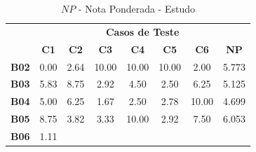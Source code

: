 \begin{table}[htbp]
	\centering
	\caption{$NP$ - Nota Ponderada - Estudo}
	\begin{tabular}{|c|ccccccc|}
		\hline
		\rowcolor[HTML]{D0CECE} 
		\cellcolor[HTML]{D0CECE} &
		\multicolumn{7}{c|}{\cellcolor[HTML]{D0CECE}\textbf{Casos   de Teste}} \\ \cline{2-8} 
		\rowcolor[HTML]{D9D9D9} 
		\multirow{-2}{*}{\cellcolor[HTML]{D0CECE}\textbf{Participante}} &
		\multicolumn{1}{c|}{\cellcolor[HTML]{D9D9D9}\textbf{C1}} &
		\multicolumn{1}{c|}{\cellcolor[HTML]{D9D9D9}\textbf{C2}} &
		\multicolumn{1}{c|}{\cellcolor[HTML]{D9D9D9}\textbf{C3}} &
		\multicolumn{1}{c|}{\cellcolor[HTML]{D9D9D9}\textbf{C4}} &
		\multicolumn{1}{c|}{\cellcolor[HTML]{D9D9D9}\textbf{C5}} &
		\multicolumn{1}{c|}{\cellcolor[HTML]{D9D9D9}\textbf{C6}} &
		\textbf{NP} \\ \hline
		\textbf{B02} &
		\multicolumn{1}{c|}{\cellcolor[HTML]{FFFFFF}0.00} &
		\multicolumn{1}{c|}{\cellcolor[HTML]{FFFFFF}2.64} &
		\multicolumn{1}{c|}{\cellcolor[HTML]{FFFFFF}10.00} &
		\multicolumn{1}{c|}{\cellcolor[HTML]{FFFFFF}10.00} &
		\multicolumn{1}{c|}{\cellcolor[HTML]{FFFFFF}10.00} &
		\multicolumn{1}{c|}{\cellcolor[HTML]{FFFFFF}2.00} &
		5.773 \\ \hline
		\rowcolor[HTML]{F2F2F2} 
		\textbf{B03} &
		\multicolumn{1}{c|}{\cellcolor[HTML]{F2F2F2}5.83} &
		\multicolumn{1}{c|}{\cellcolor[HTML]{F2F2F2}8.75} &
		\multicolumn{1}{c|}{\cellcolor[HTML]{F2F2F2}2.92} &
		\multicolumn{1}{c|}{\cellcolor[HTML]{F2F2F2}4.50} &
		\multicolumn{1}{c|}{\cellcolor[HTML]{F2F2F2}2.50} &
		\multicolumn{1}{c|}{\cellcolor[HTML]{F2F2F2}6.25} &
		5.125 \\ \hline
		\textbf{B04} &
		\multicolumn{1}{c|}{\cellcolor[HTML]{FFFFFF}5.00} &
		\multicolumn{1}{c|}{\cellcolor[HTML]{FFFFFF}6.25} &
		\multicolumn{1}{c|}{\cellcolor[HTML]{FFFFFF}1.67} &
		\multicolumn{1}{c|}{\cellcolor[HTML]{FFFFFF}2.50} &
		\multicolumn{1}{c|}{\cellcolor[HTML]{FFFFFF}2.78} &
		\multicolumn{1}{c|}{\cellcolor[HTML]{FFFFFF}10.00} &
		4.699 \\ \hline
		\rowcolor[HTML]{F2F2F2} 
		\textbf{B05} &
		\multicolumn{1}{c|}{\cellcolor[HTML]{F2F2F2}8.75} &
		\multicolumn{1}{c|}{\cellcolor[HTML]{F2F2F2}3.82} &
		\multicolumn{1}{c|}{\cellcolor[HTML]{F2F2F2}3.33} &
		\multicolumn{1}{c|}{\cellcolor[HTML]{F2F2F2}10.00} &
		\multicolumn{1}{c|}{\cellcolor[HTML]{F2F2F2}2.92} &
		\multicolumn{1}{c|}{\cellcolor[HTML]{F2F2F2}7.50} &
		6.053 \\ \hline
		\textbf{B06} &
		\multicolumn{1}{c|}{\cellcolor[HTML]{FFFFFF}1.11} &

\end{tabular}
\end{table}
